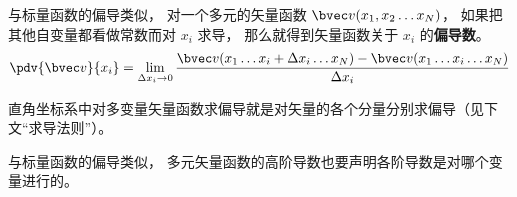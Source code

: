 
\begin{issues}
\issueDraft
{}
\end{issues}

与标量函数的偏导类似， 对一个多元的矢量函数 $\bvec v(x_1, x_2\ldots x_N)$， 如果把其他自变量都看做常数而对 $x_i$ 求导， 那么就得到矢量函数关于 $x_i$ 的\textbf{偏导数}。
\begin{equation}
\pdv{\bvec v}{x_i} = \lim_{\Delta x_i \to 0} \frac{\bvec v(x_1 \ldots x_i+\Delta x_i\ldots x_N) -  \bvec v(x_1 \ldots x_i\ldots x_N)}{\Delta x_i}
\end{equation}

直角坐标系中对多变量矢量函数求偏导就是对矢量的各个分量分别求偏导（见下文“求导法则”）。


与标量函数的偏导类似， 多元矢量函数的高阶导数也要声明各阶导数是对哪个变量进行的。
